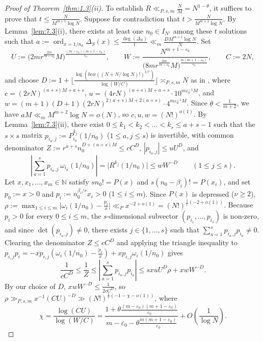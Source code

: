 \documentclass[11pt,reqno]{amsart}
\theoremstyle{remark}
\numberwithin{equation}{section}
\newcommand{\N}{\mathbb{N}}
\DeclareMathOperator{\ord}{ord}
\begin{document}
\begin{proof}[Proof of Theorem~\ref{thm:1.3}(ii)]
To establish $R \ll_{P,s,m} \frac{N}{M} = N^{1-\theta}$, it suffices to prove that $t \le \frac{N}{M^{m+1}\log N}$. Suppose for contradiction that $t > \frac{N}{M^{m+1}\log N}$. By Lemma~\ref{lem:7.3}(i), there exists at least one $n_0 \in I_{N'}$ among these $t$ solutions such that $a := \ord_{x=1/n_0} \Delta_S(x) \le \frac{\deg(\Delta_S)}{t} \ll_m \frac{DM^{m+1}\log N}{N}$. Set
\[
U := \bigl(2mr^{\frac{2m}{m-\varepsilon_0}} M\bigr)^{\frac{(m-\varepsilon_0)(m+1-\varepsilon_0)}{\varepsilon_0}}, \qquad W := \frac{N^{m+1-\varepsilon_0}}{\bigl(8mr^{\frac{2m}{m-\varepsilon_0}} M\bigr)^{\frac{m(m+1-\varepsilon_0)}{\varepsilon_0}}}, \qquad C := 2N,
\]
and choose $D := 1 + \bigl\lfloor \frac{\log(bcw((N + N/\log N)!)^{1/r})}{\log(W/C)} \bigr\rfloor \asymp_{P,s,m} N$ as in \cite[Proposition~3.4]{BuiPrattZaharescu2023}, where $c = (2rN)^{(a+s)M + a + s}$, $u = (4rN)^{(a+s)M + a + s}\allowbreak \cdot 10^{m\varepsilon_0^{-1}M}$, and $w = (m+1)(D+1)(2rN)^{2(a+s)M + 2(a+s)}\allowbreak \cdot 4^{m\varepsilon_0^{-1}M}$. Since $\theta < \frac{1}{m+2}$, we have $aM \ll_m M^{m+2}\log N = o(N)$, so $c, u, w = (N!)^{o(1)}$. By Lemma~\ref{lem:7.3}(ii), there exist $0 \le k_1 < k_2 < \dots < k_s \le a + s - 1$ such that the $s \times s$ matrix $p_{i_a,j} := P_{i_a}^{k_j}(1/n_0)$ ($1 \le a, j \le s$) is invertible, with common denominator $Z := r^{a+s} n_0^{D+(a+s)M} \le cC^D$, $|p_{i_a,j}| \le uU^D$, and
\[
\left|\sum_{a=1}^s p_{i_a,j}\,\omega_{i_a}(1/n_0)\right| = \bigl|R^{k_j}(1/n_0)\bigr| \le wW^{-D} \qquad (1 \le j \le s).
\]
Let $x, x_1, \dots, x_m \in \N$ satisfy $sn_0! = P(x)$ and $s(n_0 - \beta_i)! = P(x_i)$, and set $p_0 := x > 0$ and $p_i := n_0^{\beta_i/r} x_i > 0$ ($1 \le i \le m$). Since $P(x)$ is depressed ($\nu \ge 2$), $\rho := \max_{1 \le i \le m} \bigl|\omega_i(1/n_0) - \frac{p_i}{x}\bigr| \ll_P x^{-2+o(1)} = (N!)^{\frac{1}{r}(-2+o(1))}$. Because $p_i > 0$ for every $0 \le i \le m$, the $s$-dimensional subvector $(p_{i_1}, \dots, p_{i_s})$ is non-zero, and since $\det(p_{i_a,j}) \ne 0$, there exists $j \in \{1, \dots, s\}$ such that $\sum_{a=1}^s p_{i_a,j} p_{i_a} \ne 0$. Clearing the denominator $Z \le cC^D$ and applying the triangle inequality to $p_{i,j} p_i = -xp_{i,j}(\omega_i(1/n_0) - \frac{p_i}{x}) + xp_{i,j}\omega_i(1/n_0)$ gives
\[
\frac{1}{cC^D} \le \frac{1}{Z} \le \left|\sum_{a=1}^s p_{i_a,j} p_{i_a}\right| \le sxuU^D\rho + xwW^{-D}.
\]
By our choice of $D$, $xwW^{-D} \le \frac{1}{2cC^D}$, so $\rho \gg_{P,s,m} x^{-1}(CU)^{-D} \gg (N!)^{\frac{1}{r}(-1-\chi-o(1))}$, where
\[
\chi = \frac{\log(CU)}{\log(W/C)} = \frac{1 + \theta\frac{(m-\varepsilon_0)(m+1-\varepsilon_0)}{\varepsilon_0}}{m - \varepsilon_0 - \theta\frac{m(m+1-\varepsilon_0)}{\varepsilon_0}} + O\!\left(\frac{1}{\log N}\right).
\]
\end{proof}
\end{document}

